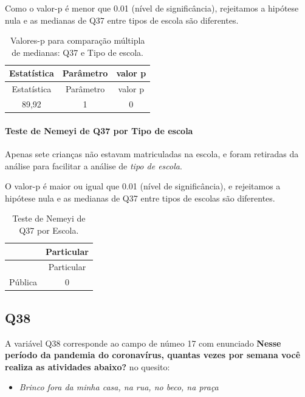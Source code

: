 \documentclass[]{article}
\providecommand{\tightlist}{%
  \setlength{\itemsep}{0pt}\setlength{\parskip}{0pt}}
\let\oldparagraph\paragraph
\renewcommand{\paragraph}[1]{\oldparagraph{#1}\mbox{}}
\begin{document}
Como o valor-p é menor que 0.01 (nível de significância), rejeitamos a hipótese nula e as medianas de Q37 entre tipos de escola são diferentes.

\begin{longtable}[]{@{}ccc@{}}
\caption{\label{tab:unnamed-chunk-1417}Valores-p para comparação múltipla de medianas: Q37 e Tipo de escola.}\tabularnewline
\toprule
Estatística & Parâmetro & valor p\tabularnewline
\midrule
\endfirsthead
\toprule
Estatística & Parâmetro & valor p\tabularnewline
\midrule
\endhead
89,92 & 1 & 0\tabularnewline
\bottomrule
\end{longtable}

\hypertarget{teste-de-nemeyi-de-q37-por-tipo-de-escola}{%
\paragraph{Teste de Nemeyi de Q37 por Tipo de escola}\label{teste-de-nemeyi-de-q37-por-tipo-de-escola}}

Apenas sete crianças não estavam matriculadas na escola, e foram retiradas da análise para facilitar a análise de \emph{tipo de escola}.

O valor-p é maior ou igual que 0.01 (nível de significância), e rejeitamos a hipótese nula e as medianas de Q37 entre tipos de escolas são diferentes.

\begin{longtable}[]{@{}lc@{}}
\caption{\label{tab:unnamed-chunk-1419}Teste de Nemeyi de Q37 por Escola.}\tabularnewline
\toprule
& Particular\tabularnewline
\midrule
\endfirsthead
\toprule
& Particular\tabularnewline
\midrule
\endhead
Pública & 0\tabularnewline
\bottomrule
\end{longtable}

\cleardoublepage

\hypertarget{q38}{%
\subsection{Q38}\label{q38}}

A variável Q38 corresponde ao campo de númeo 17 com enunciado \textbf{Nesse período da pandemia do coronavírus, quantas vezes por semana você realiza as atividades abaixo?} no quesito:

\begin{itemize}
\tightlist
\item
  \emph{Brinco fora da minha casa, na rua, no beco, na praça}
\end{itemize}
\end{document}
